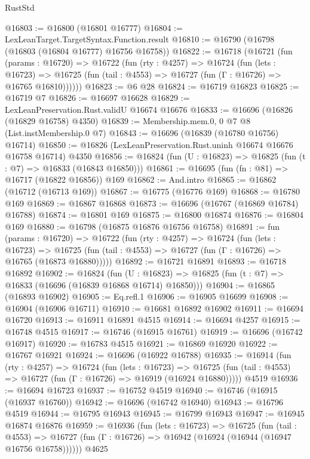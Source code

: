 \begin{lexlean}{RustStd}
\begin{coremodule}
@16803 := @16800 (@16801 @16777)
@16804 := LexLeanTarget.TargetSyntax.Function.result
@16810 := @16790 (@16798 (@16803 (@16804 @16777) @16756 @16758))
@16822 := @16718
    (@16721
      (fun (params : @16720) =>
      @16722
        (fun (rty : @4257) =>
        @16724
          (fun (lets : @16723) =>
          @16725 (fun (tail : @4553) => @16727 (fun (Γ : @16726) => @16765 @16810))))))
@16823 := @6 @28
@16824 := @16719 @16823
@16825 := @16719 @7
@16826 := @16697 @16628
@16829 := LexLeanPreservation.Rust.validU @16674 @16676
@16833 := @16696 (@16826 (@16829 @16758) @4350)
@16839 := Membership.mem.{0, 0} @7 @8 (List.instMembership.{0} @7)
@16843 := @16696 (@16839 (@16780 @16756) @16714)
@16850 := @16826 (LexLeanPreservation.Rust.uninh @16674 @16676 @16758 @16714) @4350
@16856 := @16824 (fun (U : @16823) => @16825 (fun (t : @7) => @16833 (@16843 @16850)))
@16861 := @16695 (fun (fn : @81) => @16717 (@16822 @16856)) @169
@16862 := And.intro
@16865 := @16862 (@16712 (@16713 @169))
@16867 := @16775 (@16776 @169)
@16868 := @16780 @169
@16869 := @16867 @16868
@16873 := @16696 (@16767 (@16869 @16784) @16788)
@16874 := @16801 @169
@16875 := @16800 @16874
@16876 := @16804 @169
@16880 := @16798 (@16875 @16876 @16756 @16758)
@16891 := fun (params : @16720) =>
  @16722
    (fun (rty : @4257) =>
    @16724
      (fun (lets : @16723) =>
      @16725 (fun (tail : @4553) => @16727 (fun (Γ : @16726) => @16765 (@16873 @16880)))))
@16892 := @16721 @16891
@16893 := @16718 @16892
@16902 := @16824
    (fun (U : @16823) => @16825 (fun (t : @7) => @16833 (@16696 (@16839 @16868 @16714) @16850)))
@16904 := @16865 (@16893 @16902)
@16905 := Eq.refl.{1}
@16906 := @16905 @16699
@16908 := @16904 (@16906 @16711)
@16910 := @16681 @16892 @16902
@16911 := @16694 @16720
@16913 := @16911 @16891 @4515
@16914 := @16694 @4257
@16915 := @16748 @4515
@16917 := @16746 (@16915 @16761)
@16919 := @16696 (@16742 @16917)
@16920 := @16783 @4515
@16921 := @16869 @16920
@16922 := @16767 @16921
@16924 := @16696 (@16922 @16788)
@16935 := @16914
    (fun (rty : @4257) =>
    @16724
      (fun (lets : @16723) =>
      @16725 (fun (tail : @4553) => @16727 (fun (Γ : @16726) => @16919 (@16924 @16880)))))
    @4519
@16936 := @16694 @16723
@16937 := @16752 @4519
@16940 := @16746 (@16915 (@16937 @16760))
@16942 := @16696 (@16742 @16940)
@16943 := @16796 @4519
@16944 := @16795 @16943
@16945 := @16799 @16943
@16947 := @16945 @16874 @16876
@16959 := @16936
    (fun (lets : @16723) =>
    @16725
      (fun (tail : @4553) =>
      @16727 (fun (Γ : @16726) => @16942 (@16924 (@16944 (@16947 @16756 @16758))))))
    @4625

\end{coremodule}
\end{lexlean}
